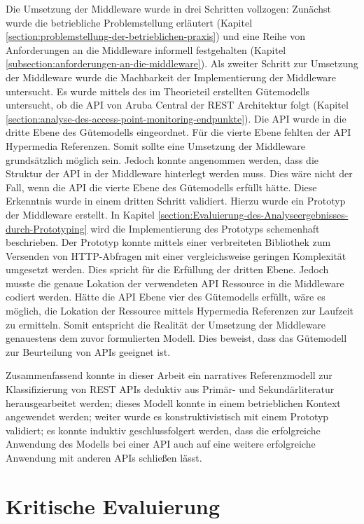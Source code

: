 Die Umsetzung der Middleware wurde in drei Schritten vollzogen: Zunächst wurde die betriebliche Problemstellung erläutert (Kapitel \ref{section:problemstellung-der-betrieblichen-praxis}) und eine Reihe von Anforderungen an die Middleware informell festgehalten (Kapitel \ref{subsection:anforderungen-an-die-middleware}). Als zweiter Schritt zur Umsetzung der Middleware wurde die Machbarkeit der Implementierung der Middleware untersucht. Es wurde mittels des im Theorieteil erstellten Gütemodells untersucht, ob die API von Aruba Central der REST Architektur folgt (Kapitel \ref{section:analyse-des-access-point-monitoring-endpunkte}). Die API wurde in die dritte Ebene des Gütemodells eingeordnet. Für die vierte Ebene fehlten der API Hypermedia Referenzen. Somit sollte eine Umsetzung der Middleware grundsätzlich möglich sein. Jedoch konnte angenommen werden, dass die Struktur der API in der Middleware hinterlegt werden muss. Dies wäre nicht der Fall, wenn die API die vierte Ebene des Gütemodells erfüllt hätte. Diese Erkenntnis wurde in einem dritten Schritt validiert. Hierzu wurde ein Prototyp der Middleware erstellt. In Kapitel \ref{section:Evaluierung-des-Analyseergebnisses-durch-Prototyping} wird die Implementierung des Prototyps schemenhaft beschrieben. Der Prototyp konnte mittels einer verbreiteten Bibliothek zum Versenden von HTTP-Abfragen mit einer vergleichsweise geringen Komplexität umgesetzt werden. Dies spricht für die Erfüllung der dritten Ebene. Jedoch musste die genaue Lokation der verwendeten API Ressource in die Middleware codiert werden. Hätte die API Ebene vier des Gütemodells erfüllt, wäre es möglich, die Lokation der Ressource mittels Hypermedia Referenzen zur Laufzeit zu ermitteln. Somit entspricht die Realität der Umsetzung der Middleware genauestens dem zuvor formulierten Modell. Dies beweist, dass das Gütemodell zur Beurteilung von APIs geeignet ist.

Zusammenfassend konnte in dieser Arbeit ein narratives Referenzmodell zur Klassifizierung von REST APIs deduktiv aus Primär- und Sekundärliteratur herausgearbeitet werden; dieses Modell konnte in einem betrieblichen Kontext angewendet werden; weiter wurde es konstruktivistisch mit einem Prototyp validiert; es konnte induktiv geschlussfolgert werden, dass die erfolgreiche Anwendung des Modells bei einer API auch auf eine weitere erfolgreiche Anwendung mit anderen APIs schließen lässt.

\section{Kritische Evaluierung}\label{section:kritische-Evaluierung}


